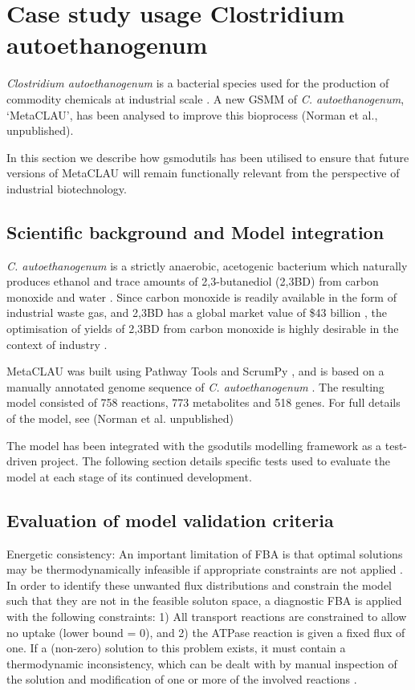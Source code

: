\documentclass[a4paper,10pt]{article}
\begin{document}
\section{Case study usage Clostridium autoethanogenum}
\textit{Clostridium autoethanogenum} is a bacterial species used for the production of commodity chemicals at industrial scale \cite{abrini1994clostridium,norman2018progress,LT}. A new GSMM of \textit{C. autoethanogenum}, `MetaCLAU', has been analysed to improve this bioprocess (Norman et al., unpublished).

In this section we describe how gsmodutils has been utilised to ensure that future versions of MetaCLAU will remain functionally relevant from the perspective of industrial biotechnology.

\subsection{Scientific background and Model integration}

\textit{C. autoethanogenum} is a strictly anaerobic, acetogenic bacterium which naturally produces ethanol and trace amounts of 2,3-butanediol (2,3BD) from carbon monoxide and water \cite{abrini1994clostridium,schuchmann2014autotrophy,norman2018progress}. Since carbon monoxide is readily available in the form of industrial waste gas, and 2,3BD has a global market value of \$43 billion \cite{kopke201123butanediol}, the optimisation of yields of 2,3BD from carbon monoxide is highly desirable in the context of industry \cite{norman2018progress}.   

MetaCLAU was built using Pathway Tools \cite{karp2002pathway} and ScrumPy \cite{poolman2006scrumpy}, and is based on a manually annotated genome sequence of \textit{C. autoethanogenum} \cite{humphreys2015whole}. The resulting model consisted of 758 reactions, 773 metabolites and 518 genes. For full details of the model, see (Norman et al. unpublished)

The model has been integrated with the gsodutils modelling framework as a test-driven project. The following section details specific tests used to evaluate the model at each stage of its continued development.

\subsection{Evaluation of model validation criteria}

Energetic consistency: An important limitation of FBA is that optimal solutions may be thermodynamically infeasible if appropriate constraints are not applied \cite{Fell1197rohtua}. In order to identify these unwanted flux distributions and constrain the model such that they are not in the feasible soluton space, a diagnostic FBA is applied with the following constraints: 1) All transport reactions are constrained to allow no uptake (lower bound = 0), and 2) the ATPase reaction is given a fixed flux of one. If a (non-zero) solution to this problem exists, it must contain a thermodynamic inconsistency, which can be dealt with by manual inspection of the solution and modification of one or more of the involved reactions \cite{Fell1197rohtua}.
 
\end{document}
